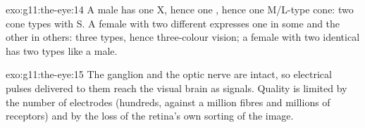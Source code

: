 \begin{solution}{exo:g11:the-eye:14}
A male has one X, hence one , hence one M/L-type cone: two cone
types with S. A female with two different  expresses one in
some  and the other in others: three types, hence three-colour
vision; a female with two identical  has two types like a male.
\end{solution}

\begin{solution}{exo:g11:the-eye:15}
The ganglion  and the optic nerve are intact, so electrical
pulses delivered to them reach the visual brain as signals. Quality is
limited by the number of electrodes (hundreds, against a million
fibres and millions of receptors) and by the loss of the retina's own
sorting of the image.
\end{solution}

